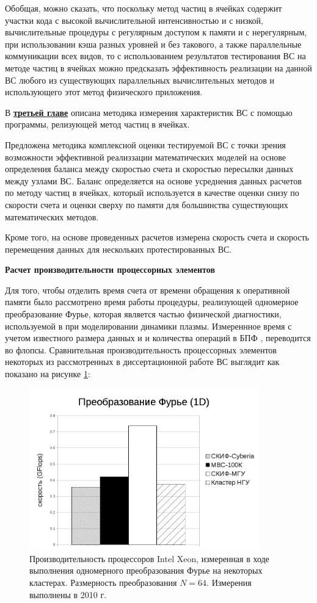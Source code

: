 Обобщая, можно сказать, что поскольку метод частиц в ячейках содержит участки кода с высокой вычислительной интенсивностью и с низкой, вычислительные процедуры с регулярным доступом к памяти и с нерегулярным, при использовании кэша разных уровней и без такового, а также параллельные коммуникации всех видов, то с использованием результатов тестирования ВС на методе частиц в ячейках можно предсказать эффективность реализации на данной ВС любого из существующих параллельных вычислительных методов и использующего этот метод физического приложения.

В \underline{\textbf{третьей главе}} описана методика измерения характеристик ВС с помощью программы, релизующей метод частиц в ячейках. 

Предложена методика комплексной оценки тестируемой ВС с точки зрения возможности эффективной реализзации математических моделей на основе определения баланса между скоростью счета и скоростью пересылки данных между узлами ВС. Баланс определяется на основе усреднения данных расчетов по методу частиц в ячейках, который используется в качестве оценки снизу по скорости счета и оценки сверху по памяти для большинства существующих математических методов.

Кроме того, на основе проведенных расчетов измерена скорость счета и скорость перемещения данных для нескольких протестированных ВС.   

\textbf{Расчет производительности процессорных элементов}

Для того, чтобы отделить время счета от времени обращения к оперативной памяти было рассмотрено время работы процедуры,
реализующей одномерное преобразование Фурье, которая является частью физической диагностики, используемой в при моделировании динамики плазмы. Измереннное время с учетом известного размера данных и и количества операций в БПФ \cite{FFT_OVS}, переводится во флопсы. Сравнительная производительность процессорных элементов некоторых из рассмотренных в диссертационной работе ВС выглядит как показано на рисунке  \ref{procs_flops}:

\begin{figure}[htb]
	\begin{center}
		\includegraphics[height=7cm,keepaspectratio]{images/processor_FLOPS.png}
	\end{center}
	\caption{Производительность процессоров Intel Xeon, измеренная в ходе выполнения одномерного преобразования Фурье на некоторых кластерах. Размерность преобразования $N=64$. Измерения выполнены в 2010 г.}
	\label{procs_flops}
\end{figure} 

